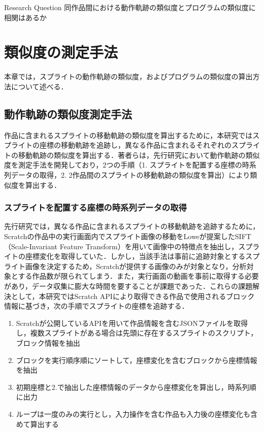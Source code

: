 \documentclass[T,J]{fose} %
\begin{document}
\begin{itembox}[l]{Research Question}
同作品間における動作軌跡の類似度とプログラムの類似度に相関はあるか
\end{itembox}

\section{類似度の測定手法}\label{sec:Similarity measurement}

本章では，スプライトの動作軌跡の類似度，およびプログラムの類似度の算出方法について述べる．

\subsection{動作軌跡の類似度測定手法}\label{subsec:Similarity movement measurement}

作品に含まれるスプライトの移動軌跡の類似度を算出するために，本研究ではスプライトの座標の移動軌跡を追跡し，異なる作品に含まれるそれぞれのスプライトの移動軌跡の類似度を算出する．著者らは，先行研究\cite{}において動作軌跡の類似度を測定手法を開発しており，2つの手順（1. スプライトを配置する座標の時系列データの取得，2. 2作品間のスプライトの移動軌跡の類似度を算出）により類似度を算出する．

\subsubsection{スプライトを配置する座標の時系列データの取得}

先行研究\cite{}では，異なる作品に含まれるスプライトの移動軌跡を追跡するために，Scratchの作品中の実行画面内でスプライト画像の移動をLoweが提案したSIFT（Scale-Invariant Feature Transform）を用いて画像中の特徴点を抽出し，スプライトの座標変化を取得していた．しかし，当該手法は事前に追跡対象とするスプライト画像を決定するため，Scratchが提供する画像のみが対象となり，分析対象とする作品数が限られてしまう．また，実行画面の動画を事前に取得する必要があり，データ収集に膨大な時間を要することが課題であった．これらの課題解決として，本研究ではScratch APIにより取得できる作品で使用されるブロック情報に基づき，次の手順でスプライトの座標を追跡する．
\begin{enumerate}
    \item Scratchが公開しているAPIを用いて作品情報を含むJSONファイルを取得し，複数スプライトがある場合は先頭に存在するスプライトのスクリプト，ブロック情報を抽出
    \item ブロックを実行順序順にソートして，座標変化を含むブロックから座標情報を抽出
    \item 初期座標と2.で抽出した座標情報のデータから座標変化を算出し，時系列順に出力
    \item ループは一度のみの実行とし，入力操作を含む作品も入力後の座標変化も含めて算出する
\end{enumerate}
\end{document}
